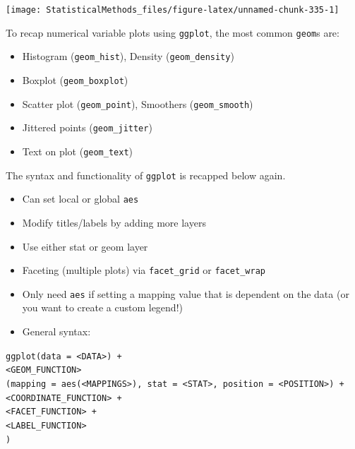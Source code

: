 \documentclass[
]{book}
\theoremstyle{definition}
\theoremstyle{definition}
\theoremstyle{definition}
\theoremstyle{remark}
\begin{document}
\begin{center}\texttt{[image: StatisticalMethods\_files/figure-latex/unnamed-chunk-335-1]} \end{center}

To recap numerical variable plots using \texttt{ggplot}, the most common \texttt{geom}s are:

\begin{itemize}
\item
  Histogram (\texttt{geom\_hist}), Density (\texttt{geom\_density})
\item
  Boxplot (\texttt{geom\_boxplot})
\item
  Scatter plot (\texttt{geom\_point}), Smoothers (\texttt{geom\_smooth})
\item
  Jittered points (\texttt{geom\_jitter})
\item
  Text on plot (\texttt{geom\_text})
\end{itemize}

The syntax and functionality of \texttt{ggplot} is recapped below again.

\begin{itemize}
\item
  Can set local or global \texttt{aes}
\item
  Modify titles/labels by adding more layers
\item
  Use either stat or geom layer
\item
  Faceting (multiple plots) via \texttt{facet\_grid} or \texttt{facet\_wrap}
\item
  Only need \texttt{aes} if setting a mapping value that is dependent on the data (or you want to create a custom legend!)
\item
  General syntax:
\end{itemize}

\texttt{ggplot(data\ =\ \textless{}DATA\textgreater{})\ +}\\
\hspace*{0.333em}\hspace*{0.333em}\texttt{\textless{}GEOM\_FUNCTION\textgreater{}(mapping\ =\ aes(\textless{}MAPPINGS\textgreater{}),\ stat\ =\ \textless{}STAT\textgreater{},\ position\ =\ \textless{}POSITION\textgreater{})\ +}\\
\hspace*{0.333em}\hspace*{0.333em}\texttt{\textless{}COORDINATE\_FUNCTION\textgreater{}\ +}\\
\hspace*{0.333em}\hspace*{0.333em}\texttt{\textless{}FACET\_FUNCTION\textgreater{}\ +}\\
\hspace*{0.333em}\hspace*{0.333em}\texttt{\textless{}LABEL\_FUNCTION\textgreater{}}\\
\texttt{)}
\end{document}
